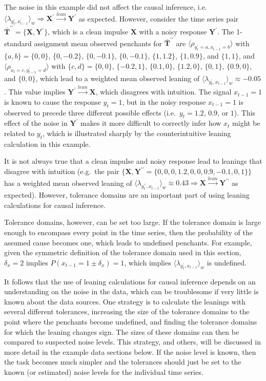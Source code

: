 \documentclass[a4paper,11pt,twocolumn]{article}
\begin{document}
The noise in this example did not affect the causal inference, i.e.\ $\langle \lambda_{y_t^\prime,x_{t-1}^\prime} \rangle_w \Rightarrow \mathbf{X}^\prime\xrightarrow{lean}\mathbf{Y}^\prime$ as expected.  However, consider the time series pair $\bar{\mathbf{T}}^{\prime\prime}=\{\mathbf{X},\mathbf{Y}^\prime\}$, which is a clean impulse $\mathbf{X}$ with a noisy response $\mathbf{Y}^\prime$. The 1-standard assignment mean observed penchants for $\bar{\mathbf{T}}^{\prime\prime}$ are $\langle \rho_{y_t^\prime=a,x_{t-1}=b} \rangle$ with $\{a,b\} = \{0,0\}$, $\{0,-0.2\}$, $\{0,-0.1\}$, $\{0,-0.1\}$, $\{1,1.2\}$, $\{1,0.9\}$, and $\{1,1\}$, and $\langle \rho_{x_t=c,y_{t-1}^\prime=d} \rangle$ with $\{c,d\} = \{0,0\}$, $\{-0.2,1\}$, $\{0.1,0\}$, $\{1.2,0\}$, $\{0,1\}$, $\{0.9,0\}$, and $\{0,0\}$, which lead to a weighted mean observed leaning of $\langle \lambda_{y_t^\prime,x_{t-1}} \rangle_w \approx -0.05$.  This value implies $\mathbf{Y}^\prime\xrightarrow{lean}\mathbf{X}$, which disagrees with intuition.  The signal $x_{t-1} = 1$ is known to cause the response $y_t=1$, but in the noisy response $x_{t-1}=1$ is observed to precede three different possible effects (i.e.\ $y_t = 1.2$, $0.9$, or $1$).  This effect of the noise in $\mathbf{Y}^\prime$ makes it more difficult to correctly infer how $x_t$ might be related to $y_t$, which is illustrated sharply by the counterintuitive leaning calculation in this example.  

It is not always true that a clean impulse and noisy response lead to leanings that disagree with intuition (e.g.\ the pair $\{\mathbf{X},\mathbf{Y}^{\prime\prime} = \{0,0,0,1.2,0,0,0.9,-0.1,0,1\}\}$ has a weighted mean observed leaning of $\langle \lambda_{y_t^{\prime\prime},x_{t-1}} \rangle_w \approx 0.43 \Rightarrow \mathbf{X}\xrightarrow{lean}\mathbf{Y}^{\prime\prime}$ as expected).  However, tolerance domains are an important part of using leaning calculations for causal inference.  

Tolerance domains, however, can be set too large.  If the tolerance domain is large enough to encompass every point in the time series, then the probability of the assumed cause becomes one, which leads to undefined penchants.  For example, given the symmetric definition of the tolerance domain used in this section, $\delta_x = 2$ implies $P(x_{t-1} = 1\pm\delta_x) = 1$, which implies $\langle \lambda_{y_t^\prime,x_{t-1}} \rangle_w$ is undefined.

It follows that the use of leaning calculations for causal inference depends on an understanding on the noise in the data, which can be troublesome if very little is known about the data sources.  One strategy is to calculate the leanings with several different tolerances, increasing the size of the tolerance domains to the point where the penchants become undefined, and finding the tolerance domains for which the leaning changes sign.  The sizes of these domains can then be compared to suspected noise levels.  This strategy, and others, will be discussed in more detail in the example data sections below.  If the noise level is known, then the task becomes much simpler and the tolerances should just be set to the known (or estimated) noise levels for the individual time series.
\end{document}
